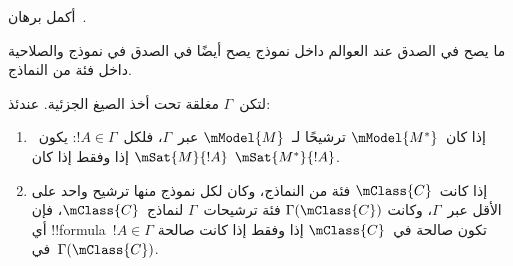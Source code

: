 \documentclass[../../../include/open-logic-section]{subfiles}
\begin{document}
\begin{prob}
  أكمل برهان~.
\end{prob}

ما يصح في الصدق عند العوالم داخل نموذج يصح أيضًا في الصدق في نموذج
والصلاحية داخل فئة من النماذج.

\begin{cor}
  لتكن~$\Gamma$ مغلقة تحت أخذ الصيغ الجزئية. عندئذ:
  \begin{enumerate}
  \item إذا كان~$\mModel{M^*}$ ترشيحًا لـ~$\mModel{M}$ عبر~$\Gamma$،
    فلكل~$!A \in \Gamma$: يكون~$\mSat{M}{!A}$ إذا وفقط إذا كان
    $\mSat{M^*}{!A}$.
  \item إذا كانت~$\mClass{C}$ فئة من النماذج، وكان لكل نموذج منها
    ترشيح واحد على الأقل عبر~$\Gamma$، وكانت
    $\Gamma(\mClass{C})$ فئة ترشيحات~$\Gamma$ لنماذج~$\mClass{C}$،
    فإن أي !!{formula}~$!A \in \Gamma$ تكون صالحة في~$\mClass{C}$ إذا
    وفقط إذا كانت صالحة في~$\Gamma(\mClass{C})$.
  \end{enumerate}
\end{cor}
\end{document}
